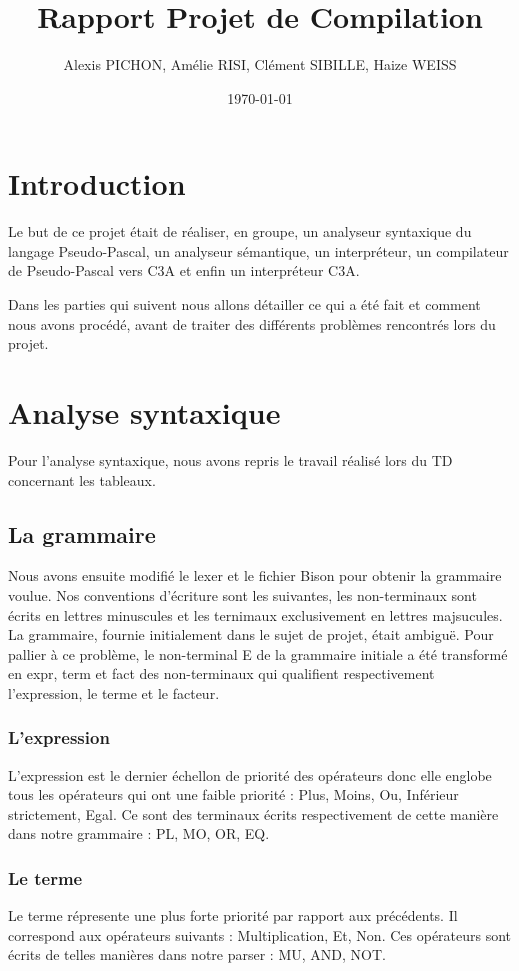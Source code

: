\documentclass[11pt,a4paper]{article}
\title{Rapport Projet de Compilation}
\author{Alexis PICHON, Amélie RISI, Clément SIBILLE, Haize WEISS}
\date{\today}
\begin{document}
\maketitle
\pagebreak
\tableofcontents
\pagebreak

\setlength{\parskip}{1em}
\setlength{\intextsep}{2em}


\section{Introduction}
Le but de ce projet était de réaliser, en groupe, un analyseur syntaxique du langage Pseudo-Pascal, un analyseur sémantique, un interpréteur, un compilateur de Pseudo-Pascal vers C3A et enfin un interpréteur C3A.
\par
Dans les parties qui suivent nous allons détailler ce qui a été fait et comment nous avons procédé, avant de traiter des différents problèmes rencontrés lors du projet.


\section{Analyse syntaxique}
Pour l'analyse syntaxique, nous avons repris le travail réalisé lors du TD concernant les tableaux. 

\subsection{La grammaire}
Nous avons ensuite modifié le lexer et le fichier Bison pour obtenir la grammaire voulue. Nos conventions d'écriture sont les suivantes, les non-terminaux sont écrits en lettres minuscules et les ternimaux exclusivement en lettres majsucules. 
La grammaire, fournie initialement dans le sujet de projet, était ambiguë. Pour pallier à ce problème, le non-terminal E de la grammaire initiale a été transformé en expr, term et fact des non-terminaux qui qualifient respectivement l'expression, le terme et le facteur. 
\subsubsection{L'expression}
L'expression est le dernier échellon de priorité des opérateurs donc elle englobe tous les opérateurs qui ont une faible priorité : Plus, Moins, Ou, Inférieur strictement, Egal. 
Ce sont des terminaux écrits respectivement de cette manière dans notre grammaire : PL, MO, OR, EQ.
\subsubsection{Le terme}
Le terme répresente une plus forte priorité par rapport aux précédents. Il correspond aux opérateurs suivants : Multiplication, Et, Non.
Ces opérateurs sont écrits de telles manières dans notre parser : MU, AND, NOT.  
\end{document}
